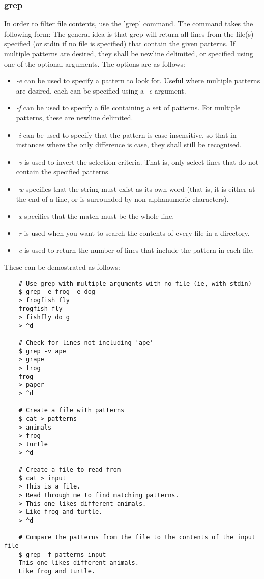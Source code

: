 \documentclass{article}
\begin{document}
\subsubsection{grep}
In order to filter file contents, use the 'grep' command. The command takes the following form:
The general idea is that grep will return all lines from the file(s) specified (or stdin if no file is specified) that contain the given patterns. If multiple patterns are desired, they shall be newline delimited, or specified using one of the optional arguments. The options are as follows:
\begin{itemize}
    \item \textit{-e} can be used to specify a pattern to look for. Useful where multiple patterns are desired, each can be specified using a \textit{-e} argument.
    \item \textit{-f} can be used to specify a file containing a set of patterns. For multiple patterns, these are newline delimited.
    \item \textit{-i} can be used to specify that the pattern is case insensitive, so that in instances where the only difference is case, they shall still be recognised.
    \item \textit{-v} is used to invert the selection criteria. That is, only select lines that do not contain the specified patterns.
    \item \textit{-w} specifies that the string must exist as its own word (that is, it is either at the end of a line, or is surrounded by non-alphanumeric characters).
    \item \textit{-x} specifies that the match must be the whole line.
    \item \textit{-r} is used when you want to search the contents of every file in a directory.
    \item \textit{-c} is used to return the number of lines that include the pattern in each file.
\end{itemize}

These can be demostrated as follows:
\begin{verbatim}
    # Use grep with multiple arguments with no file (ie, with stdin)
    $ grep -e frog -e dog
    > frogfish fly
    frogfish fly
    > fishfly do g
    > ^d

    # Check for lines not including 'ape'
    $ grep -v ape
    > grape
    > frog
    frog
    > paper
    > ^d

    # Create a file with patterns
    $ cat > patterns
    > animals
    > frog
    > turtle
    > ^d

    # Create a file to read from
    $ cat > input
    > This is a file.
    > Read through me to find matching patterns.
    > This one likes different animals.
    > Like frog and turtle.
    > ^d

    # Compare the patterns from the file to the contents of the input file
    $ grep -f patterns input
    This one likes different animals.
    Like frog and turtle.
\end{verbatim}
\end{document}

